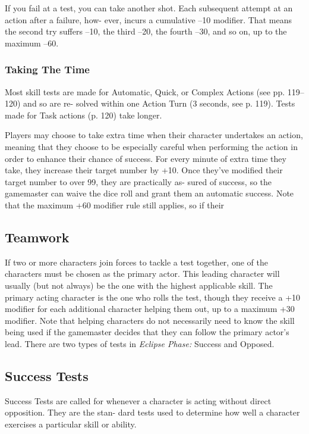 If you fail at a test, you can take another shot. Each 
subsequent attempt at an action after a failure, how-
ever, incurs a cumulative –10 modifier. That means the 
second try suffers –10, the third –20, the fourth –30, 
and so on, up to the maximum –60.

\subsubsection{Taking The Time}

Most skill tests are made for Automatic, Quick, or 
Complex Actions (see pp. 119–120) and so are re-
solved within one Action Turn (3 seconds, see p. 119). 
Tests made for Task actions (p. 120) take longer.

Players may choose to take extra time when their 
character undertakes an action, meaning that they 
choose to be especially careful when performing the 
action in order to enhance their chance of success. For 
every minute of extra time they take, they increase 
their target number by +10. Once they've modified 
their target number to over 99, they are practically as-
sured of success, so the gamemaster can waive the dice 
roll and grant them an automatic success. Note that 
the maximum +60 modifier rule still applies, so if their 

\subsection{Teamwork}

If two or more characters join forces to tackle a test 
together, one of the characters must be chosen as the 
primary actor. This leading character will usually (but 
not always) be the one with the highest applicable 
skill. The primary acting character is the one who 
rolls the test, though they receive a +10 modifier for 
each additional character helping them out, up to a 
maximum +30 modifier. Note that helping characters 
do not necessarily need to know the skill being used 
if the gamemaster decides that they can follow the 
primary actor's lead.
There are two types of tests in \textit{Eclipse Phase:} Success 
and Opposed.

\subsection{Success Tests}

Success Tests are called for whenever a character is 
acting without direct opposition. They are the stan-
dard tests used to determine how well a character 
exercises a particular skill or ability.

